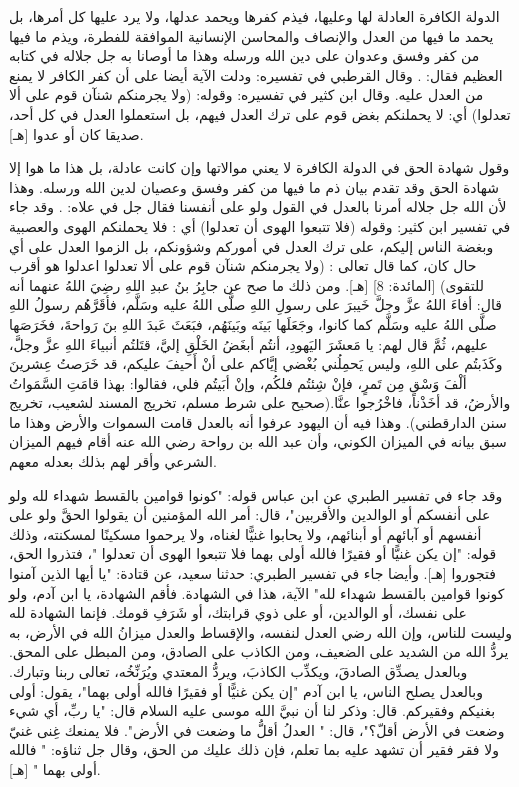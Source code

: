 الدولة الكافرة العادلة لها وعليها، فيذم كفرها ويحمد عدلها، ولا يرد عليها كل أمرها، بل يحمد ما فيها من العدل والإنصاف والمحاسن الإنسانية الموافقة للفطرة، ويذم ما فيها من كفر وفسق وعدوان على دين الله ورسله وهذا ما أوصانا به جل جلاله في كتابه العظيم فقال: 
\quranayah*[5][8]{\footnotesize \surahname*[5]}. وقال القرطبي في تفسيره: ودلت الآية أيضا على أن كفر الكافر لا يمنع من العدل عليه. وقال ابن كثير في تفسيره: وقوله: (ولا يجرمنكم شنآن قوم على ألا تعدلوا) أي: لا يحملنكم بغض قوم على ترك العدل فيهم، بل استعملوا العدل في كل أحد، صديقا كان أو عدوا [هـ]. 


وقول شهادة الحق في الدولة الكافرة لا يعني موالاتها وإن كانت عادلة، بل هذا ما هوا إلا شهادة الحق وقد تقدم بيان ذم ما فيها من كفر وفسق وعصيان لدين الله ورسله. وهذا لأن الله جل جلاله أمرنا بالعدل في القول ولو على أنفسنا فقال جل في علاه:
\quranayah*[4][135]{\footnotesize \surahname*[4]}. وقد جاء في تفسير ابن كثير: وقوله (فلا تتبعوا الهوى أن تعدلوا) أي : فلا يحملنكم الهوى والعصبية وبغضة الناس إليكم، على ترك العدل في أموركم وشؤونكم، بل الزموا العدل على أي حال كان، كما قال تعالى : (ولا يجرمنكم شنآن قوم على ألا تعدلوا اعدلوا هو أقرب للتقوى) [المائدة: 8] [هـ]. ومن ذلك ما صح عن جابِرُ بنُ عبدِ اللهِ رضِيَ اللهُ عنهما أنه قال: أفاءَ اللهُ عزَّ وجلَّ خَيبرَ على رسولِ اللهِ صلَّى اللهُ عليه وسَلَّم، فأقَرَّهُم رسولُ اللهِ صلَّى اللهُ عليه وسَلَّم كما كانوا، وجَعَلَها بَينَه وبَينَهُم، فبَعَثَ عَبدَ اللهِ بنَ رَواحةَ، فخَرَصَها عليهم، ثُمَّ قال لهم: يا مَعشَرَ اليَهودِ، أنتُم أبغَضُ الخَلْقِ إليَّ، قتَلتُم أنبياءَ اللهِ عزَّ وجلَّ، وكَذَبتُم على اللهِ، وليس يَحمِلُني بُغْضي إيَّاكم على أنْ أَحيفَ عليكم، قد خَرَصتُ عِشرينَ ألْفَ وَسْقٍ مِن تَمرٍ، فإنْ شِئتُم فلكُم، وإنْ أبَيتُم فلي، فقالوا: بهذا قامَتِ السَّمَواتُ والأرضُ، قد أخَذْنا، فاخْرُجوا عنَّا.{\footnotesize (صحيح على شرط مسلم، تخريج المسند لشعيب، تخريج سنن الدارقطني)}. وهذا فيه أن اليهود عرفوا أنه بالعدل قامت السموات والأرض وهذا ما سبق بيانه في الميزان الكوني، وأن عبد الله بن رواحة رضي الله عنه أقام فيهم الميزان الشرعي وأقر لهم بذلك بعدله معهم. 

وقد جاء في تفسير الطبري عن ابن عباس قوله: "كونوا قوامين بالقسط شهداء لله ولو على أنفسكم أو الوالدين والأقربين"، قال: أمر الله المؤمنين أن يقولوا الحقَّ ولو على أنفسهم أو آبائهم أو أبنائهم، ولا يحابوا غنيًّا لغناه، ولا يرحموا مسكينًا لمسكنته، وذلك قوله: "إن يكن غنيًّا أو فقيرًا فالله أولى بهما فلا تتبعوا الهوى أن تعدلوا "، فتذروا الحق، فتجوروا [هـ]. وأيضا جاء في تفسير الطبري: حدثنا سعيد، عن قتادة: "يا أيها الذين آمنوا كونوا قوامين بالقسط شهداء لله" الآية، هذا في الشهادة. فأقم الشهادة، يا ابن آدم، ولو على نفسك، أو الوالدين، أو على ذوي قرابتك، أو شَرَفِ قومك. فإنما الشهادة لله وليست للناس، وإن الله رضي العدل لنفسه، والإقساط والعدل ميزانُ الله في الأرض، به يردُّ الله من الشديد على الضعيف، ومن الكاذب على الصادق، ومن المبطل على المحق. وبالعدل يصدِّق الصادقَ، ويكذِّب الكاذبَ، ويردُّ المعتدي ويُرَنِّخُه، تعالى ربنا وتبارك. وبالعدل يصلح الناس، يا ابن آدم "إن يكن غنيًّا أو فقيرًا فالله أولى بهما"، يقول: أولى بغنيكم وفقيركم. قال: وذكر لنا أن نبيَّ الله موسى عليه السلام قال: "يا ربِّ، أي شيء وضعت في الأرض أقلّ؟"، قال: " العدلُ أقلُّ ما وضعت في الأرض". فلا يمنعك غِنى غنيّ ولا فقر فقير أن تشهد عليه بما تعلم، فإن ذلك عليك من الحق، وقال جل ثناؤه: " فالله أولى بهما " [هـ].



